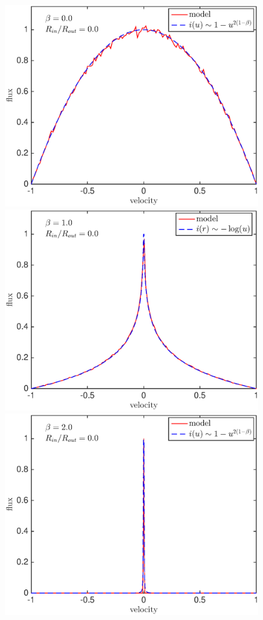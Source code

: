 \documentclass[useAMS,usenatbib,usegraphicx]{mnras}
\begin{document}
\begin{figure}
\\
\includegraphics[trim =25 5 45 15,clip=true,scale=0.34]{params/A/b0_r0}  
\includegraphics[trim =37 5 45 15,clip=true,scale=0.34]{params/A/b1_r0} 
\includegraphics[trim =37 5 45 15,clip=true,scale=0.34]{params/A/b2_r0}


\end{figure}
\end{document}
